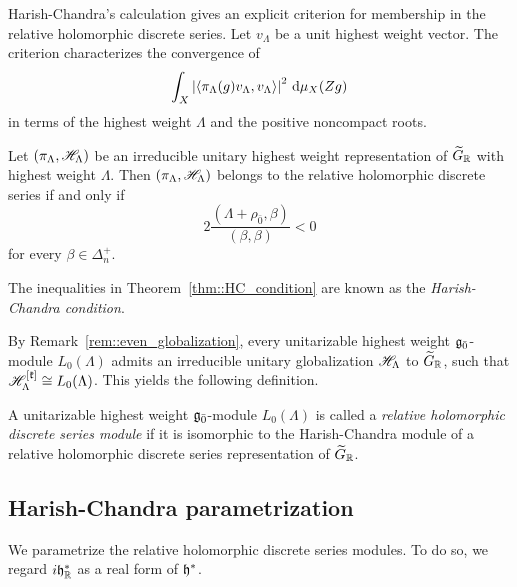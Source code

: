 Harish-Chandra's calculation gives an explicit criterion for membership in the relative holomorphic discrete series. Let $v_{\Lambda}$ be a unit highest weight vector. The criterion characterizes the convergence of
\begin{equation}
\int_X
\left|{\langle\pi_{\Lambda}(g)v_{\Lambda},v_{\Lambda}\rangle}\right|^{2}
\,\mathrm{d}\mu_X(Zg)
\end{equation}
in terms of the highest weight $\Lambda$ and the positive noncompact roots.

\begin{theorem}
\label{thm::HC_condition}
Let $(\pi_{\Lambda},{\mathscr{H}}_{\Lambda})$ be an irreducible unitary highest weight representation of $\widetilde{G}_{{\mathbb R}}$ with highest weight $\Lambda$. Then $(\pi_{\Lambda},{\mathscr{H}}_{\Lambda})$ belongs to the relative holomorphic discrete series if and only if
\begin{equation*}
2\frac{(\Lambda+\rho_{\bar0},\beta)}{(\beta,\beta)}<0
\end{equation*}
for every $\beta\in\Delta_n^+$.
\end{theorem}

\begin{remark}
The inequalities in Theorem~\ref{thm::HC_condition} are known as the \emph{Harish-Chandra condition}.
\end{remark}

By Remark~\ref{rem::even_globalization}, every unitarizable highest weight ${\mathfrak{g}_{\bar{0}}}$-module $L_{0}(\Lambda)$ admits an irreducible unitary globalization ${\mathscr{H}}_{\Lambda}$ to $\widetilde{G}_{{\mathbb R}}$, such that ${\mathscr{H}}_{\Lambda}^{[{\mathfrak k}]} \cong L_{0}(\Lambda)$. This yields the following definition. 

\begin{definition} A unitarizable highest weight ${\mathfrak{g}_{\bar{0}}}$-module $L_{0}(\Lambda)$ is called a \emph{relative holomorphic discrete series module} if it is isomorphic to the Harish-Chandra module of a relative holomorphic discrete series representation of $\widetilde{G}_{{\mathbb R}}$.
\end{definition}

\subsection{Harish-Chandra parametrization}
\label{subsec::HC_parameterization}
We parametrize the relative holomorphic discrete series modules. To do so, we regard $i{\mathfrak h}_{{\mathbb R}}^{\ast}$ as a real form of ${\mathfrak h}^{\ast}$. 

